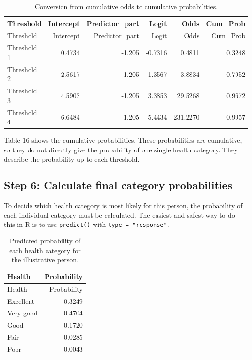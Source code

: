 \documentclass{article}
\begin{document}
\begin{longtable}[]{@{}lrrrrr@{}}
\caption{Conversion from cumulative odds to cumulative
probabilities.}\tabularnewline
\toprule\noalign{}
Threshold & Intercept & Predictor\_part & Logit & Odds & Cum\_Prob \\
\midrule\noalign{}
\endfirsthead
\toprule\noalign{}
Threshold & Intercept & Predictor\_part & Logit & Odds & Cum\_Prob \\
\midrule\noalign{}
\endhead
\bottomrule\noalign{}
\endlastfoot
Threshold 1 & 0.4734 & -1.205 & -0.7316 & 0.4811 & 0.3248 \\
Threshold 2 & 2.5617 & -1.205 & 1.3567 & 3.8834 & 0.7952 \\
Threshold 3 & 4.5903 & -1.205 & 3.3853 & 29.5268 & 0.9672 \\
Threshold 4 & 6.6484 & -1.205 & 5.4434 & 231.2270 & 0.9957 \\
\end{longtable}

Table 16 shows the cumulative probabilities. These probabilities are
cumulative, so they do not directly give the probability of one single
health category. They describe the probability up to each threshold.

\subsection{Step 6: Calculate final category
probabilities}\label{step-6-calculate-final-category-probabilities}

To decide which health category is most likely for this person, the
probability of each individual category must be calculated. The easiest
and safest way to do this in R is to use \texttt{predict()} with
\texttt{type\ =\ "response"}.

\begin{longtable}[]{@{}lr@{}}
\caption{Predicted probability of each health category for the
illustrative person.}\tabularnewline
\toprule\noalign{}
Health & Probability \\
\midrule\noalign{}
\endfirsthead
\toprule\noalign{}
Health & Probability \\
\midrule\noalign{}
\endhead
\bottomrule\noalign{}
\endlastfoot
Excellent & 0.3249 \\
Very good & 0.4704 \\
Good & 0.1720 \\
Fair & 0.0285 \\
Poor & 0.0043 \\
\end{longtable}
\end{document}
